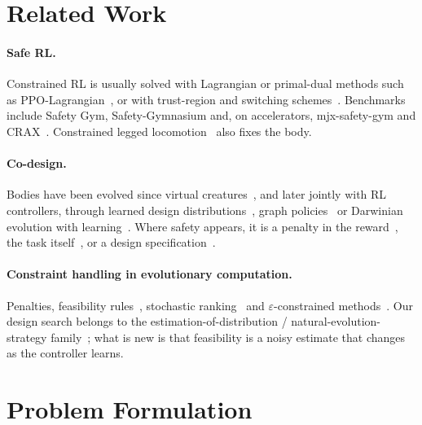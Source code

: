 \documentclass[sigconf,review]{acmart}
\begin{document}
\section{Related Work}
\label{sec:related}

\paragraph{Safe RL.} Constrained RL is usually solved with Lagrangian or primal-dual methods such as PPO-Lagrangian~\cite{ray2019benchmarking,stooke2020responsive}, or with trust-region and switching schemes~\cite{achiam2017cpo,xu2021crpo,sootla2022saute}. Benchmarks include Safety Gym, Safety-Gymnasium and, on accelerators, mjx-safety-gym and CRAX~\cite{ray2019benchmarking,ji2023safetygymnasium,vanderhart_mjxsafetygym,tomilin2026crax}. Constrained legged locomotion~\cite{kim2024constraints,chanesane2024cat} also fixes the body.

\paragraph{Co-design.} Bodies have been evolved since virtual creatures~\cite{sims1994evolving,lipson2000automatic}, and later jointly with RL controllers, through learned design distributions~\cite{ha2019reinforcement,schaff2019jointly}, graph policies~\cite{wang2019nge,yuan2022transform2act} or Darwinian evolution with learning~\cite{gupta2021embodied}. Where safety appears, it is a penalty in the reward~\cite{codesign2025notfree}, the task itself~\cite{yue2025humanoid}, or a design specification~\cite{glamdring2026}.

\paragraph{Constraint handling in evolutionary computation.} Penalties, feasibility rules~\cite{deb2000efficient}, stochastic ranking~\cite{runarsson2000stochastic} and $\varepsilon$-constrained methods~\cite{takahama2006constrained}. Our design search belongs to the estimation-of-distribution / natural-evolution-strategy family~\cite{larranaga2002estimation,wierstra2014natural}; what is new is that feasibility is a noisy estimate that changes as the controller learns.

\section{Problem Formulation}
\label{sec:problem}
\end{document}
